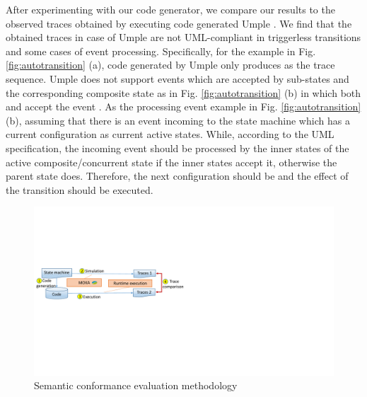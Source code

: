 After experimenting with our code generator, we compare our results to the observed traces obtained by executing code generated 
Umple \cite{Badreddin2014}. 
We find that the obtained traces in case of 
Umple are not UML-compliant in triggerless transitions and some cases of event processing.
Specifically, for the example in Fig. \ref{fig:autotransition} (a), 
code generated by Umple only produces  as the trace sequence. 
Umple does not support events which are accepted by sub-states and the corresponding composite state as in Fig. \ref{fig:autotransition} (b) in which both  and  accept the event .
As the processing event example in Fig. \ref{fig:autotransition} (b), assuming that there is an event  incoming to the state machine which has a current configuration  as current active states. While, according to the UML specification, the incoming event should be processed by the inner states of the active composite/concurrent state if the inner states accept it, otherwise the parent state does. Therefore, the next configuration should be  and the  effect of the transition  should be executed. %


\begin{figure}
\centering
\includegraphics[clip, trim=0.2cm 8.6cm 19.4cm 6.9cm, width=0.8\columnwidth]{figures/semanticconformance.pdf}
\caption{Semantic conformance evaluation methodology} 
\label{fig:semanticconformance}
\end{figure}

